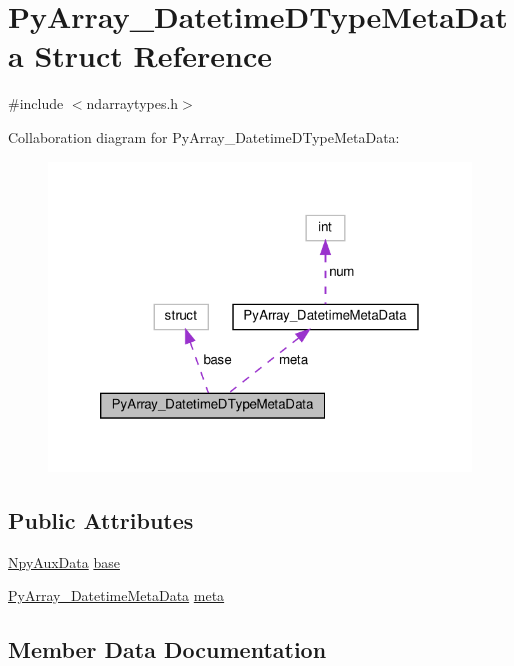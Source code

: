 \hypertarget{structPyArray__DatetimeDTypeMetaData}{}\section{Py\+Array\+\_\+\+Datetime\+D\+Type\+Meta\+Data Struct Reference}
\label{structPyArray__DatetimeDTypeMetaData}


{\ttfamily \#include $<$ndarraytypes.\+h$>$}



Collaboration diagram for Py\+Array\+\_\+\+Datetime\+D\+Type\+Meta\+Data\+:
\nopagebreak
\begin{figure}[H]
\begin{center}
\leavevmode
\includegraphics[width=320pt]{structPyArray__DatetimeDTypeMetaData__coll__graph}
\end{center}
\end{figure}
\subsection*{Public Attributes}
\begin{DoxyCompactItemize}
\item 
\hyperlink{ndarraytypes_8h_a1f4020347b3c55cf6320697d1a3dca83}{Npy\+Aux\+Data} \hyperlink{structPyArray__DatetimeDTypeMetaData_aa4aeb5a80f1c13da13559ce8cb079cad}{base}
\item 
\hyperlink{structPyArray__DatetimeMetaData}{Py\+Array\+\_\+\+Datetime\+Meta\+Data} \hyperlink{structPyArray__DatetimeDTypeMetaData_a51264309a5c295a3d8a1335a60c33f19}{meta}
\end{DoxyCompactItemize}


\subsection{Member Data Documentation}
\mbox{\label{structPyArray__DatetimeDTypeMetaData_aa4aeb5a80f1c13da13559ce8cb079cad}} 
